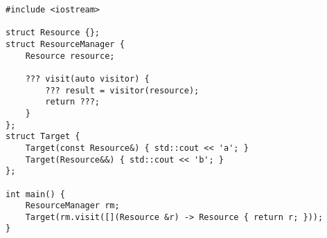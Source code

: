 \begin{lstlisting}[title=\href{https://godbolt.org/z/hpwkER}{\texttt{godbolt.org/z/hpwkER}}]
#include <iostream>

struct Resource {};
struct ResourceManager {
    Resource resource;

    ??? visit(auto visitor) {
        ??? result = visitor(resource);
        return ???;
    }
};
struct Target {
    Target(const Resource&) { std::cout << 'a'; }
    Target(Resource&&) { std::cout << 'b'; }
};

int main() {
    ResourceManager rm;
    Target(rm.visit([](Resource &r) -> Resource { return r; }));
}
\end{lstlisting}
